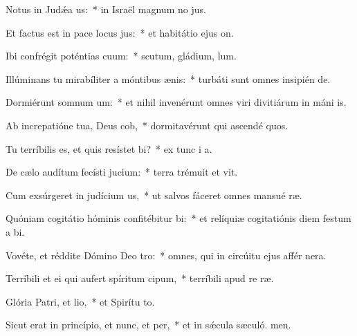 \item Notus in Judǽa us:~* in Israël magnum no jus.
\item Et factus est in pace locus jus:~* et habitátio ejus  on.
\item Ibi confrégit poténtias cuum:~* scutum, gládium,  lum.
\item Illúminans tu mirabíliter a móntibus ænis:~* turbáti sunt omnes insipién de.
\item Dormiérunt somnum um:~* et nihil invenérunt omnes viri divitiárum in máni is.
\item Ab increpatióne tua, Deus cob,~* dormitavérunt qui ascendé quos.
\item Tu terríbilis es, et quis resístet bi?~* ex tunc i a.
\item De cælo audítum fecísti jucium:~* terra trémuit et vit.
\item Cum exsúrgeret in judícium us,~* ut salvos fáceret omnes mansué ræ.
\item Quóniam cogitátio hóminis confitébitur bi:~* et relíquiæ cogitatiónis diem festum a bi.
\item Vovéte, et réddite Dómino Deo tro:~* omnes, qui in circúitu ejus affér nera.
\item Terríbili et ei qui aufert spíritum cipum,~* terríbili apud re ræ.
\item Glória Patri, et lio,~* et Spirítu to.
\item Sicut erat in princípio, et nunc, et per,~* et in sǽcula sæculó. men.
